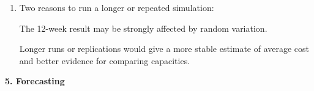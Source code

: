 \documentclass[11pt,a4paper]{article}
\begin{document}
\begin{enumerate}
On this run, capacity 6 gives the lowest average weekly cost of \pounds175.5. The other averages are \pounds176.0 for capacity 7, \pounds184.0 for capacity 8 and \pounds192.0 for capacity 9. Therefore, 6 bays appears to be the optimal capacity from this simulation. Increasing capacity beyond 6 raises the fixed bay cost faster than it reduces overflow cost on this run.

\item Two reasons to run a longer or repeated simulation:

The 12-week result may be strongly affected by random variation.

Longer runs or replications would give a more stable estimate of average cost and better evidence for comparing capacities.
\end{enumerate}

\textbf{5. Forecasting}
\end{document}

